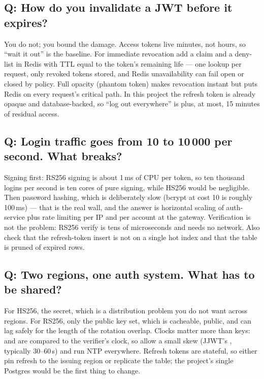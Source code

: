 \subsection*{Q: How do you invalidate a JWT before it expires?}

You do not; you bound the damage. Access tokens live minutes, not hours,
so ``wait it out'' is the baseline. For immediate revocation add a
 claim and a deny-list in Redis with TTL equal to the token's
remaining life --- one lookup per request, only revoked tokens stored,
and Redis unavailability can fail open or closed by policy. Full
opacity (phantom token) makes revocation instant but puts Redis on
every request's critical path. In this project the refresh token is
already opaque and database-backed, so ``log out everywhere'' is
 plus, at most, 15
minutes of residual access.

\subsection*{Q: Login traffic goes from 10 to 10\,000 per second. What breaks?}

Signing first: RS256 signing is about 1\,ms of CPU per token, so ten
thousand logins per second is ten cores of pure signing, while HS256
would be negligible. Then password hashing, which is deliberately slow
(bcrypt at cost 10 is roughly 100\,ms) --- that is the real wall, and
the answer is horizontal scaling of auth-service plus rate limiting
per IP and per account at the gateway. Verification is not the problem:
RS256 verify is tens of microseconds and needs no network. Also check
that the refresh-token insert is not on a single hot index and that
the  table is pruned of expired rows.

\subsection*{Q: Two regions, one auth system. What has to be shared?}

For HS256, the secret, which is a distribution problem you do not want
across regions. For RS256, only the public key set, which is
cacheable, public, and can lag safely for the length of the rotation
overlap. Clocks matter more than keys:  and  are
compared to the verifier's clock, so allow a small skew (JJWT's
, typically 30--60\,s) and run NTP everywhere.
Refresh tokens are stateful, so either pin refresh to the issuing
region or replicate the table; the project's single Postgres would be
the first thing to change.

